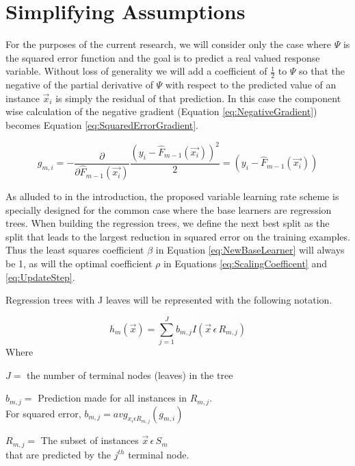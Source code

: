 \documentclass[conference]{IEEEtran}
\begin{document}
\section{Simplifying Assumptions}
\label{sec:SimplifyingAssumptions}
For the purposes of the current research, we will consider only the case where \(\Psi\) is the squared error function and the goal is to predict a real valued response variable. Without loss of generality we will add a coefficient of \(\frac{1}{2}\) to \(\Psi\) so that the negative of the partial derivative of \(\Psi\) with respect to the predicted value of an instance \(\vec{x}_i\) is simply the residual of that prediction. In this case the component wise calculation of the negative gradient (Equation \ref{eq:NegativeGradient}) becomes Equation \ref{eq:SquaredErrorGradient}.

\begin{equation}
g_{m,i} = -\frac{\partial}{\partial \hat{F}_{m-1}(\vec{x_i})} \frac{(y_i - \hat{F}_{m-1}(\vec{x_i}))^2}{2} = (y_i - \hat{F}_{m-1}(\vec{x_i}))
\label{eq:SquaredErrorGradient}
\end{equation}

As alluded to in the introduction, the proposed variable learning rate scheme is specially designed for the common case where the base learners are regression trees. When building the regression trees, we define the next best split as the split that leads to the largest reduction in squared error on the training examples. Thus the least squares coefficient \(\beta\) in Equation \ref{eq:NewBaseLearner} will always be 1, as will the optimal coefficient \(\rho\) in Equations \ref{eq:ScalingCoefficent} and \ref{eq:UpdateStep}. 

Regression trees with J leaves will be represented with the following notation.
	
	\begin{equation}
	h_m(\vec{x}) = \sum_{j=1}^{J}b_{m,j}I(\vec{x} \, \epsilon \, R_{m,j})
	\end{equation}
	Where 
	\begin{center}
		\(J =\) the number of terminal nodes (leaves) in the tree 
	\end{center}
	\begin{center}
		\(b_{m,j} =\) Prediction made for all instances in \(R_{m,j}\).\\ 
		For squared error, \(b_{m,j} =  avg_{x_i \epsilon R_{m,j}}( g_{m, i}) \) 
	\end{center}
	\begin{center}
		\(R_{m,j} = \) The subset of instances \(\vec{x} \, \epsilon \, S_m\) \\
		that are predicted by the \(j^{th}\) terminal node.
	\end{center}
	
\end{document}
